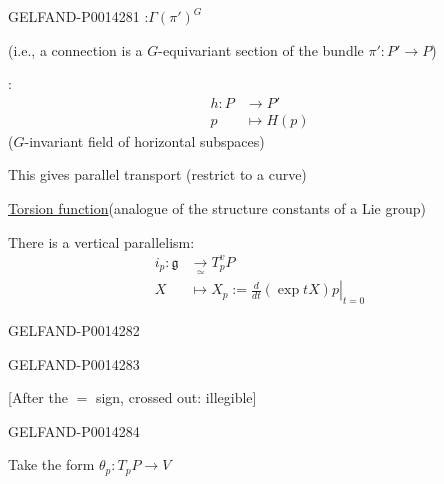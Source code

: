 \begin{GelfandAdjacentEvidence}{GELFAND-P001428}{1}
:\quad \(\Gamma(\pi')^G\)

(i.e., a connection is a \(G\)-equivariant section of the bundle \(\pi'\colon P'\to P\))

:
\[
\begin{aligned}
h\colon P&\to P'\\
p&\mapsto H(p)
\end{aligned}
\]
(\(G\)-invariant field of horizontal subspaces)

This gives parallel transport (restrict to a curve)

\uline{Torsion function}\qquad (analogue of the structure constants of a Lie group)

There is a vertical parallelism:
\[
\begin{aligned}
i_p\colon\mathfrak g&\underset{\simeq}{\longrightarrow}T_p^vP\\
X&\mapsto X_p:=\left.\frac{d}{dt}(\exp tX)p\right|_{t=0}
\end{aligned}
\]
\end{GelfandAdjacentEvidence}
\begin{GelfandAdjacentEvidence}{GELFAND-P001428}{2}


\end{GelfandAdjacentEvidence}
\begin{GelfandAdjacentEvidence}{GELFAND-P001428}{3}

[After the \(=\) sign, crossed out: illegible]
\end{GelfandAdjacentEvidence}
\begin{GelfandAdjacentEvidence}{GELFAND-P001428}{4}


Take the form \(\theta_p\colon T_pP\to V\)
\end{GelfandAdjacentEvidence}

